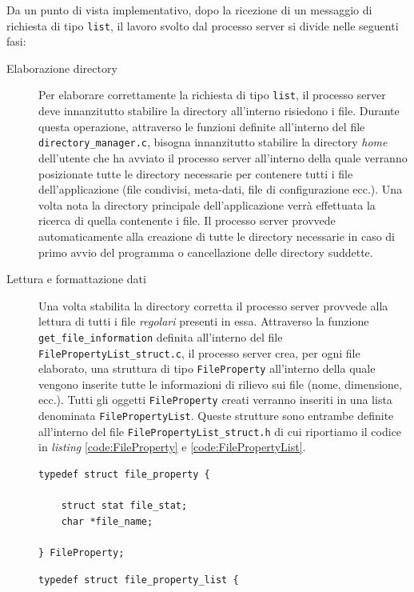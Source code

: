 \documentclass[10pt,a4paper, titlepage]{report}
\begin{document}
Da un punto di vista implementativo, dopo la ricezione di un messaggio di richiesta di tipo \texttt{list}, il lavoro svolto dal processo server si divide nelle seguenti fasi:

\begin{description}
\item[Elaborazione directory] Per elaborare correttamente la richiesta di tipo \texttt{list}, il processo server deve innanzitutto stabilire la directory all'interno risiedono i file. Durante questa operazione, attraverso le funzioni definite all'interno del file \texttt{directory\_manager.c}, bisogna innanzitutto stabilire la directory \textit{home} dell'utente che ha avviato il processo server all'interno della quale verranno posizionate tutte le directory necessarie per contenere tutti i file dell'applicazione (file condivisi, meta-dati, file di configurazione ecc.). Una volta nota la directory principale dell'applicazione verrà effettuata la ricerca di quella contenente i file. Il processo server provvede automaticamente alla creazione di tutte le directory necessarie in caso di primo avvio del programma o cancellazione delle directory suddette.  
\item[Lettura e formattazione dati] Una volta stabilita la directory corretta il processo server provvede alla lettura di tutti i file \textit{regolari} presenti in essa. Attraverso la funzione \texttt{get\_file\_information} definita all'interno del file \texttt{FilePropertyList\_struct.c}, il processo server crea, per ogni file elaborato, una struttura di tipo \texttt{FileProperty} all'interno della quale vengono inserite tutte le informazioni di rilievo sui file (nome, dimensione, ecc.). Tutti gli oggetti \texttt{FileProperty} creati verranno inseriti in una lista denominata  \texttt{FilePropertyList}. Queste strutture sono entrambe definite all'interno del file \texttt{FilePropertyList\_struct.h} di cui riportiamo il codice in \textit{listing} \ref{code:FileProperty} e \ref{code:FilePropertyList}.

\begin{lstlisting}[frame=lines, caption={Implementazione della struttura \texttt{FileProperty}}, label={code:FileProperty}]
typedef struct file_property {

	struct stat file_stat;
	char *file_name;

} FileProperty;
\end{lstlisting}

\begin{lstlisting}[frame=lines, caption={Implementazione della struttura \texttt{FileProperty}}, label={code:FilePropertyList}]
typedef struct file_property_list {


\end{lstlisting}
\end{description}
\end{document}
